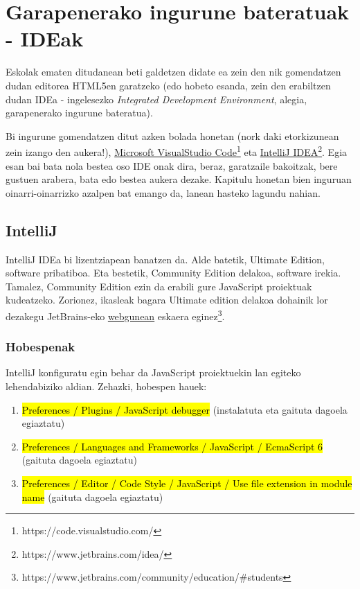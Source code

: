 \chapter{Garapenerako ingurune bateratuak - IDEak}

Eskolak ematen ditudanean beti galdetzen didate ea zein den nik gomendatzen dudan editorea HTML5en garatzeko (edo hobeto esanda, zein den erabiltzen dudan IDEa  - ingelesezko \textit{Integrated Development Environment}, alegia, garapenerako ingurune bateratua). 

Bi ingurune gomendatzen ditut azken bolada honetan (nork daki etorkizunean zein izango den aukera!), \href{https://code.visualstudio.com/}{Microsoft VisualStudio Code}\footnote{https://code.visualstudio.com/} eta  \href{https://www.jetbrains.com/idea/}{IntelliJ IDEA}\footnote{https://www.jetbrains.com/idea/}. Egia esan bai bata nola bestea oso IDE onak dira, beraz, garatzaile bakoitzak, bere gustuen arabera, bata edo bestea aukera dezake. Kapitulu honetan bien inguruan oinarri-oinarrizko azalpen bat emango da, lanean hasteko lagundu nahian.

\section{IntelliJ} 

IntelliJ IDEa bi lizentziapean banatzen da. Alde batetik, Ultimate Edition, software pribatiboa. Eta bestetik, Community Edition delakoa, software irekia. Tamalez, Community Edition ezin da erabili gure JavaScript proiektuak kudeatzeko. Zorionez, ikasleak bagara Ultimate edition delakoa dohainik lor dezakegu JetBrains-eko \href{https://www.jetbrains.com/community/education/\#students}{webgunean} eskaera eginez\footnote{https://www.jetbrains.com/community/education/\#students}.

\subsection{Hobespenak}
IntelliJ konfiguratu egin behar da JavaScript proiektuekin lan egiteko lehendabiziko aldian. Zehazki, hobespen hauek:

\begin{enumerate}
    \item \hl{Preferences / Plugins / JavaScript debugger}  (instalatuta eta gaituta dagoela egiaztatu)
    \item \hl{Preferences / Languages and Frameworks / JavaScript / EcmaScript 6} (gaituta dagoela egiaztatu)
    \item \hl{Preferences / Editor / Code Style / JavaScript / Use file extension in module name} (gaituta dagoela egiaztatu)
\end{enumerate}

